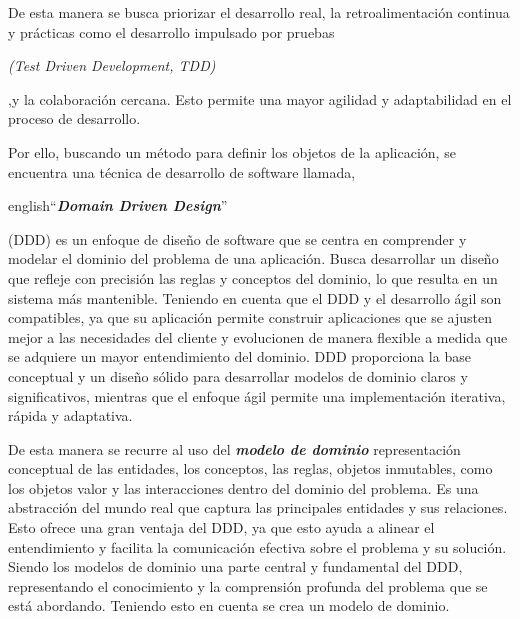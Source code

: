 De esta manera se busca priorizar el desarrollo real, la retroalimentación continua y prácticas como 
el desarrollo impulsado por pruebas \begin{otherlanguage}{english}\textit{(Test Driven Development, TDD)}\end{otherlanguage}  ,y la colaboración cercana. Esto permite una mayor 
agilidad y adaptabilidad en el proceso de desarrollo.

Por ello, buscando un método para definir los objetos de la aplicación, se encuentra una técnica de 
desarrollo de software llamada, \begin{otherlanguage}
{english}``\textit{\textbf{Domain Driven Design}}''\end{otherlanguage}(DDD) \cite{NvDDD} es un enfoque 
de diseño de software que se centra en comprender y modelar el dominio del problema de una aplicación. 
Busca desarrollar un diseño que refleje con precisión las reglas y conceptos del dominio, lo que 
resulta en un sistema más mantenible. Teniendo en cuenta que el DDD y el desarrollo ágil son 
compatibles, ya que su aplicación permite construir aplicaciones que se ajusten mejor a las necesidades 
del cliente y evolucionen de manera flexible a medida que se adquiere un mayor entendimiento del 
dominio. DDD proporciona la base conceptual y un diseño sólido para desarrollar modelos de dominio 
claros y significativos, mientras que el enfoque ágil permite una implementación iterativa, rápida y 
adaptativa.

De esta manera se recurre al uso del \textit{\textbf{modelo de dominio}} representación conceptual de 
las entidades, los conceptos, las reglas, objetos inmutables, como los objetos valor y las 
interacciones dentro del dominio del problema. Es una abstracción del mundo real que captura las 
principales entidades y sus relaciones. Esto ofrece una gran ventaja del DDD, ya que esto ayuda a 
alinear el entendimiento y facilita la comunicación efectiva sobre el problema y su solución. Siendo 
los modelos de dominio una parte central y fundamental del DDD, representando el conocimiento y la 
comprensión profunda del problema que se está abordando. Teniendo esto en cuenta se crea un modelo de 
dominio.

